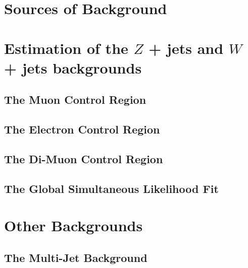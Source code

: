 \documentclass[10pt,twoside,cucitura,classica,english,openany]{toptesi}
\begin{document}
\section{Sources of Background}
\label{sec:sources-background}



\section{Estimation of the $Z$ + jets and $W$ + jets backgrounds}
\label{sec:estimation-z-+}



\subsection{The Muon Control Region}
\label{sec:muon-control-region}



\subsection{The Electron Control Region}
\label{sec:electr-contr-regi}



\subsection{The Di-Muon Control Region}
\label{sec:di-muon-control}



\subsection{The Global Simultaneous Likelihood Fit}
\label{sec:glob-simult-likel}



\section{Other Backgrounds}
\label{sec:other-backgrounds}

\subsection{The Multi-Jet Background}
\label{sec:multi-jet-background}
\end{document}
